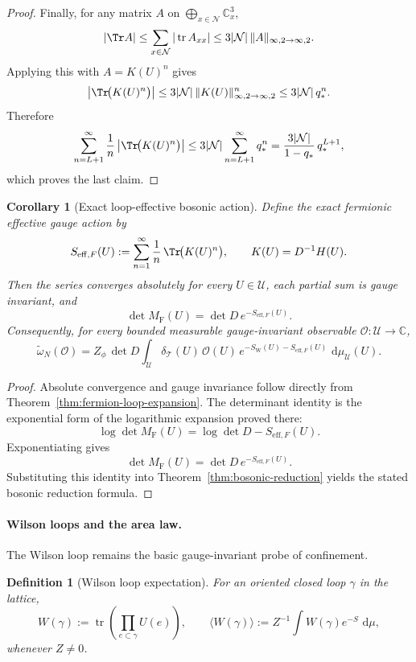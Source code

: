 \documentclass[11pt]{article}
\newtheorem{definition}[theorem]{Definition}
\newtheorem{corollary}[theorem]{Corollary}
\theoremstyle{remark}
\newcommand{\C}{\mathbb C}
\newcommand{\mcN}{\mathcal N}
\newcommand{\mcT}{\mathcal T}
\newcommand{\mcU}{\mathscr U}
\newcommand{\mcO}{\mathcal O}
\newcommand{\tr}{\operatorname{tr}}
\newcommand{\dd}{\,\mathrm d}
\begin{document}
\begin{proof}
Finally, for any matrix \(A\) on \(\bigoplus_{x\in\mcN}\C_x^3\),
\[
|\Tr A|
\le
\sum_{x\in\mcN} |\tr A_{xx}|
\le
3|\mcN|\,\|A\|_{\infty,2\to\infty,2}.
\]
Applying this with \(A=K(U)^n\) gives
\[
\left|\Tr\!\bigl(K(U)^n\bigr)\right|
\le
3|\mcN|\,\|K(U)\|_{\infty,2\to\infty,2}^n
\le
3|\mcN|\,q_*^n.
\]
Therefore
\[
\sum_{n=L+1}^\infty \frac1n
\left|\Tr\!\bigl(K(U)^n\bigr)\right|
\le
3|\mcN|\sum_{n=L+1}^\infty q_*^n
=
\frac{3|\mcN|}{1-q_*}\,q_*^{L+1},
\]
which proves the last claim.
\end{proof}

\begin{corollary}[Exact loop-effective bosonic action]
\label{cor:loop-effective-bosonic-action}
Define the exact fermionic effective gauge action by
\[
S_{\mathrm{eff},F}(U)
:=
\sum_{n=1}^\infty \frac1n\,\Tr\!\bigl(K(U)^n\bigr),
\qquad
K(U)=D^{-1}H(U).
\]
Then the series converges absolutely for every \(U\in\mcU\), each partial sum
is gauge invariant, and
\[
\det M_{\mathrm F}(U)
=
\det D\,e^{-S_{\mathrm{eff},F}(U)}.
\]
Consequently, for every bounded measurable gauge-invariant observable
\(\mcO:\mcU\to\C\),
\[
\widetilde\omega_N(\mcO)
=
Z_\phi\,\det D
\int_{\mcU}
\delta_{\mcT}(U)\,\mcO(U)\,
e^{-S_{\mathrm W}(U)-S_{\mathrm{eff},F}(U)}\,
\dd\mu_{\mcU}(U).
\]
\end{corollary}

\begin{proof}
Absolute convergence and gauge invariance follow directly from
Theorem~\ref{thm:fermion-loop-expansion}.  The determinant identity is the
exponential form of the logarithmic expansion proved there:
\[
\log\det M_{\mathrm F}(U)=\log\det D-S_{\mathrm{eff},F}(U).
\]
Exponentiating gives
\[
\det M_{\mathrm F}(U)=\det D\,e^{-S_{\mathrm{eff},F}(U)}.
\]
Substituting this identity into Theorem~\ref{thm:bosonic-reduction} yields the
stated bosonic reduction formula.
\end{proof}

\paragraph{Wilson loops and the area law.}
The Wilson loop remains the basic gauge-invariant probe of confinement.

\begin{definition}[Wilson loop expectation]
\label{def:wilson-loop-exp}
For an oriented closed loop $\gamma$ in the lattice,
\[
W(\gamma):=\tr\!\left(\prod_{e\subset \gamma}U(e)\right),
\qquad
\langle W(\gamma)\rangle := Z^{-1}\int W(\gamma)e^{-S}\,\dd\mu,
\]
whenever $Z\neq 0$.
\end{definition}
\end{document}

